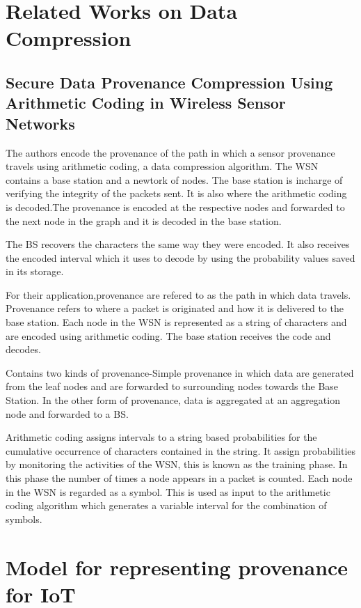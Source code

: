 \section{Related Works on Data Compression}

\subsection{Secure Data Provenance Compression Using Arithmetic Coding in Wireless Sensor Networks}

The authors encode the provenance of the path in which a sensor provenance travels using arithmetic coding, a data compression algorithm. The WSN contains a base station and a newtork of nodes. The base station is incharge of verifying the integrity of the packets sent. It is also where the arithmetic coding is decoded.The provenance is encoded at the respective nodes and forwarded to the next node in the graph and it is decoded in the base station. 

The BS recovers the characters the same way they were encoded. It also receives the encoded interval which it uses to decode by using the probability values saved in its storage.



For their application,provenance are refered to as the path in which data travels. Provenance refers to where a packet is originated and how it is delivered to the base station. Each node in the WSN is represented as a string of characters and are encoded using arithmetic coding. The base station receives the code and decodes.

Contains two kinds of provenance-Simple provenance in which data are generated from the leaf nodes and are forwarded to surrounding nodes towards the Base Station. In the other form of provenance, data is aggregated at an aggregation node and forwarded to a BS.

Arithmetic coding assigns intervals to a string based  probabilities for the cumulative occurrence of characters contained in the string. It assign probabilities by monitoring the activities of the WSN, this is known as the training phase. In this phase the number of times a node appears in a packet is counted.  Each node in the WSN is regarded as a symbol. This is used as input to the arithmetic coding algorithm which generates a variable interval for the combination of symbols.






\section{Model for representing provenance for IoT}

